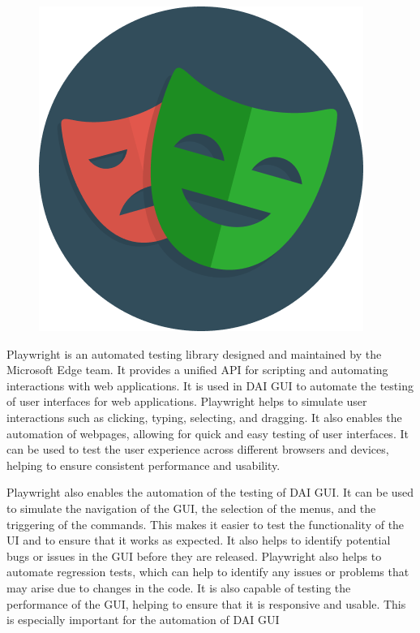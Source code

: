 \documentclass[12pt,a4paper]{report}
\begin{document}
\begin{figure}
\includegraphics[width=1\linewidth]{playwright.png}
\end{figure}

Playwright\cite{noauthor_fast_nodate} is an automated testing library designed and maintained by the Microsoft Edge team. It provides a unified API for scripting and automating interactions with web applications. It is used in \ac{DAI} GUI to automate the testing of user interfaces for web applications. Playwright helps to simulate user interactions such as clicking, typing, selecting, and dragging. It also enables the automation of webpages, allowing for quick and easy testing of user interfaces. It can be used to test the user experience across different browsers and devices, helping to ensure consistent performance and usability. 

Playwright also enables the automation of the testing of \ac{DAI} GUI. It can be used to simulate the navigation of the GUI, the selection of the menus, and the triggering of the commands. This makes it easier to test the functionality of the UI and to ensure that it works as expected. It also helps to identify potential bugs or issues in the GUI before they are released. Playwright also helps to automate regression tests, which can help to identify any issues or problems that may arise due to changes in the code. It is also capable of testing the performance of the GUI, helping to ensure that it is responsive and usable. This is especially important for the automation of \ac{DAI} GUI
\end{document}
